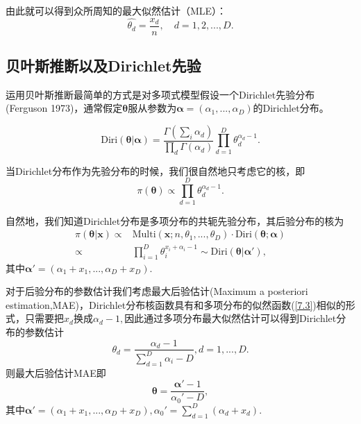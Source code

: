 \documentclass[12pt,hyperref,a4paper,UTF8]{ctexart}
\begin{document}
由此就可以得到众所周知的最大似然估计（MLE）：
\begin{equation*}
    \hat{\theta_d}=\frac{x_d}{n},\quad d=1,2,...,D.
\end{equation*}
\subsection{贝叶斯推断以及Dirichlet先验}

运用贝叶斯推断最简单的方式是对多项式模型假设一个Dirichlet先验分布(Ferguson 1973)，通常假定$\boldsymbol{\theta}$服从参数为$\boldsymbol{\alpha}=(\alpha_1,...,\alpha_D)$的Dirichlet分布。

\begin{equation*}
    \text{Diri}(\boldsymbol{\theta}|\boldsymbol{\alpha})=\frac{\Gamma(\sum_{i}\alpha_d)}{\prod_d\Gamma(\alpha_d)}\prod_{d=1}^D \theta_d^{\alpha_d-1}.
\end{equation*}

当Dirichlet分布作为先验分布的时候，我们很自然地只考虑它的核，即
\begin{equation*}
    \pi(\boldsymbol{\theta})\varpropto \prod_{d=1}^D\theta_d^{\alpha_d-1}. 
\end{equation*}

自然地，我们知道Dirichlet分布是多项分布的共轭先验分布，其后验分布的核为
\begin{align*}
    \pi(\boldsymbol{\theta}|\boldsymbol{x})\varpropto &\text{Multi}(\boldsymbol{x};n,\theta_1,...,\theta_D)\cdot \text{Diri}(\boldsymbol{\theta};\boldsymbol{\alpha})\\
    \varpropto & \prod_{i=1}^D \theta_i^{x_i+\alpha_i-1}\sim \text{Diri}(\boldsymbol{\theta}|\boldsymbol{\alpha'}),
\end{align*}
其中$\boldsymbol{\alpha'}=(\alpha_1+x_1,...,\alpha_D+x_D).$

对于后验分布的参数估计我们考虑最大后验估计(Maximum a posteriori estimation,MAE)，Dirichlet分布核函数具有和多项分布的似然函数(\ref{7.3})相似的形式，只需要把$x_d$换成$\alpha_d-1,$因此通过多项分布最大似然估计可以得到Dirichlet分布的参数估计
\begin{equation*}
    \theta_d=\frac{\alpha_d-1}{\sum_{d=1}^D \alpha_i-D},d=1,...,D.
\end{equation*}
则最大后验估计MAE即
\begin{equation}
    \boldsymbol{\theta}=\frac{\boldsymbol{\alpha'}-1}{\alpha_0'-D},\label{MAE}
\end{equation}
其中$\boldsymbol{\alpha'}=(\alpha_1+x_1,...,\alpha_D+x_D),\alpha_0'=\sum_{d=1}^D(\alpha_d+x_d)$.
\end{document}
